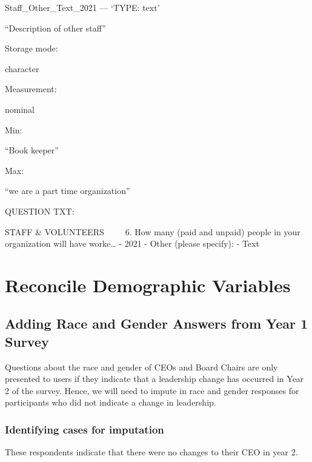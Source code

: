 \documentclass[
  letterpaper,
]{scrbook}
\begin{document}
Staff\_Other\_Text\_2021 --- {`TYPE: text'}

``Description of other staff''

Storage mode:

character

Measurement:

nominal

Min:

``Book keeper''

Max:

``we are a part time organization''

QUESTION TXT:

STAFF \& VOLUNTEERS ~~ ~ 6. How many (paid and unpaid) people in your
organization will have worke\ldots{} - 2021 - Other (please specify): -
Text

\chapter{Reconcile Demographic
Variables}\label{reconcile-demographic-variables}

\section{Adding Race and Gender Answers from Year 1
Survey}\label{adding-race-and-gender-answers-from-year-1-survey}

Questions about the race and gender of CEOs and Board Chairs are only
presented to users if they indicate that a leadership change has
occurred in Year 2 of the survey. Hence, we will need to impute in race
and gender responses for participants who did not indicate a change in
leadership.

\subsection{Identifying cases for
imputation}\label{identifying-cases-for-imputation}

These respondents indicate that there were no changes to their CEO in
year 2.
\end{document}

